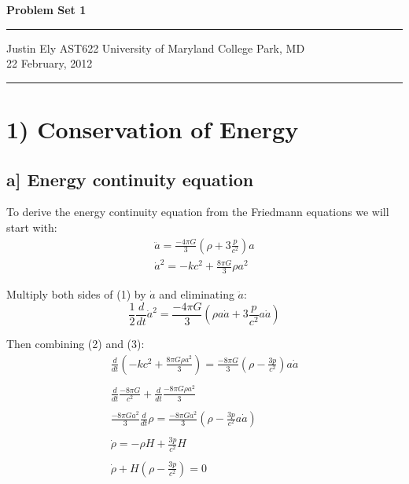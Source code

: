 \documentclass[a4paper,11pt]{article}
\begin{document}
\begin{flushright}

\vspace{1.1cm}

{\bf\Huge Problem Set 1}

\rule{0.25\linewidth}{0.5pt}

\vspace{0.5cm}
Justin Ely
\linebreak
\newline
\footnotesize{AST622 University of Maryland College Park, MD\\}
\vspace{0.5cm}
22 February, 2012
\end{flushright}

\noindent\rule{\linewidth}{1.0pt}
\section*{1) Conservation of Energy}
\subsection*{a] Energy continuity equation}
To derive the energy continuity equation from the Friedmann equations we will start with:
\begin{eqnarray}
\ddot{a}=\frac{-4\pi G}{3}(\rho+3\frac{p}{c^2})a \\
\dot{a}^2=-kc^2+\frac{8 \pi G}{3} \rho a^2
\end{eqnarray}

Multiply both sides of (1) by $\dot{a}$ and eliminating $\ddot{a}$:
\begin{equation}
\frac{1}{2}\frac{d}{dt}\dot{a}^2=\frac{-4\pi G}{3}(\rho a \dot{a}+3\frac{p}{c^2} a \dot{a})
\end{equation}

Then combining (2) and (3):
\begin{eqnarray}
\frac{d}{dt}(-kc^2+\frac{8 \pi G \rho a^2}{3})= \frac{-8 \pi G}{3}(\rho-\frac{3p}{c^2})a \dot{a} \nonumber \\
\nonumber \\
\frac{d}{dt}\frac{-8 \pi G}{c^2}+\frac{d}{dt}\frac{-8 \pi G \rho a^2}{3}                         \nonumber \\
\nonumber \\
\frac{-8 \pi G a^2}{3} \frac{d}{dt}\rho= \frac{-8 \pi G a^2}{3}(\rho - \frac{3p}{c^2}a \dot{a})    \nonumber \\
\nonumber \\
\dot{\rho}=-\rho H + \frac{3p}{c^2}H                                  \nonumber \\
\nonumber \\
\dot{\rho}+H(\rho-\frac{3p}{c^2})=0 
\nonumber \\
\end{eqnarray}
\end{document}
